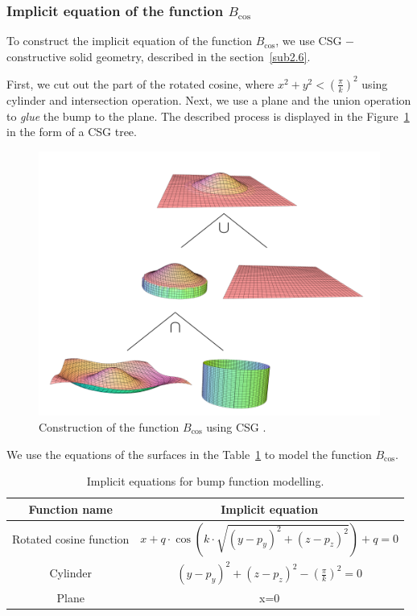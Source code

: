 \subsubsection*{Implicit equation of the function $B_{\cos}$}
To construct the implicit equation of the function $B_{\cos}$, we use CSG
$-$ constructive solid geometry, described in the section~\ref{sub2.6}.

First, we cut out the part of the rotated cosine, where
$x^2+y^2<(\frac{\pi}{k})^2$ using cylinder and intersection operation. Next,
we use a plane and the union operation to \textit{glue} the bump to the plane.
The described process is displayed in the Figure~\ref{img:24} in the form of a CSG tree.
\begin{figure}
    \centerline{\includegraphics[scale=0.5]{images/img24}}
    \caption[Construction of the function $B_{\cos}$ using CSG]
    {Construction of the function $B_{\cos}$ using CSG \cite{calcplot3d}.}
    \label{img:24}
\end{figure}
We use the equations of the surfaces in the Table~\ref{tab:1} to model 
the function $B_{\cos}$.

\begin{table}[h!]
    \centering 
    \begin{tabular}{|c|c|}
        \hline\hline
    Function name            & Implicit equation                                        \\ \hline\hline
    Rotated cosine function & $x+q \cdot \cos(k \cdot \sqrt{(y-p_y)^2+(z-p_z)^2})+q=0$  \\ \hline
    Cylinder                & $(y-p_y)^2+(z-p_z)^2-(\frac{\pi}{k})^2=0$                \\ \hline
    Plane                   & x=0                                                      \\ \hline\hline
    \end{tabular}
    \caption[Implicit equations for bump function modelling]
    {Implicit equations for bump function modelling.}
    \label{tab:1}
    \end{table}

